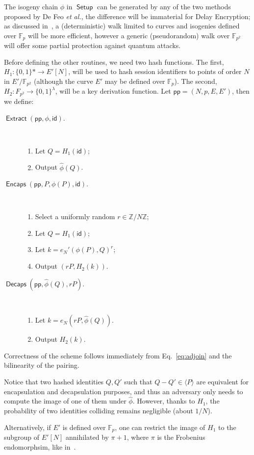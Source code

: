 \documentclass{llncs}
\newcommand{\Z}{\mathbb{Z}}
\newcommand{\F}{\mathbb{F}}
\DeclareMathOperator{\Setup}{\mathsf{Setup}}
\DeclareMathOperator{\Extract}{\mathsf{Extract}}
\DeclareMathOperator{\Encaps}{\mathsf{Encaps}}
\DeclareMathOperator{\Decaps}{\mathsf{Decaps}}
\newcommand{\pp}{\mathsf{pp}}
\newcommand{\id}{\mathsf{id}}
\begin{document}
The isogeny chain $\phi$ in $\Setup$ can be generated by any of the
two methods proposed by De Feo \emph{et al.}, the difference will be
immaterial for Delay Encryption; as discussed
in~\cite{10.1007/978-3-030-34578-5_10}, a (deterministic) walk limited
to curves and isogenies defined over $\F_p$ will be more efficient,
however a generic (pseudorandom) walk over $\F_{p^2}$ will offer some
partial protection against quantum attacks.

Before defining the other routines, we need two hash functions. %
The first, $H_1:\{0,1\}*\to E'[N]$, will be used to hash session
identifiers to points of order $N$ in $E'/\F_{p^2}$ (although the
curve $E'$ may be defined over $\F_p$). %
The second, $H_2:F_{p^2}\to\{0,1\}^\lambda$, will be a key derivation
function. %
Let $\pp = (N,p,E,E')$, then we define:

\begin{description}
\item[$\Extract(\pp,\phi,\id)$.]\
  \begin{enumerate}
  \item Let $Q = H_1(\id)$;
  \item Output $\hat\phi(Q)$.
  \end{enumerate}
\item[$\Encaps(\pp,P,\phi(P),\id)$.]\
  \begin{enumerate}
  \item Select a uniformly random $r\in\Z/N\Z$;
  \item Let $Q = H_1(\id)$;
  \item Let $k=e_N'(\phi(P),Q)^r$;
  \item Output $(rP,H_2(k))$.
  \end{enumerate}
\item[$\Decaps(\pp,\hat\phi(Q),rP)$.]\
  \begin{enumerate}
  \item Let $k = e_N(rP,\hat\phi(Q))$.
  \item Output $H_2(k)$.
  \end{enumerate}
\end{description}

Correctness of the scheme follows immediately from
Eq.~\eqref{eq:adjoin} and the bilinearity of the pairing. %

\begin{remark}
  Notice that two hashed identities $Q,Q'$ such that
  $Q-Q'\in \langle P\rangle$ are equivalent for encapsulation and
  decapsulation purposes, and thus an adversary only needs to compute
  the image of one of them under $\hat\phi$. %
  However, thanks to $H_1$, the probability of two identities
  colliding remains negligible (about $1/N$).
  
  Alternatively, if $E'$ is defined over $\F_p$, one can restrict the
  image of $H_1$ to the subgroup of $E'[N]$ annihilated by $\pi+1$,
  where $\pi$ is the Frobenius endomorphsim, like
  in~\cite{10.1007/978-3-030-34578-5_10}.
\end{remark}
\end{document}
